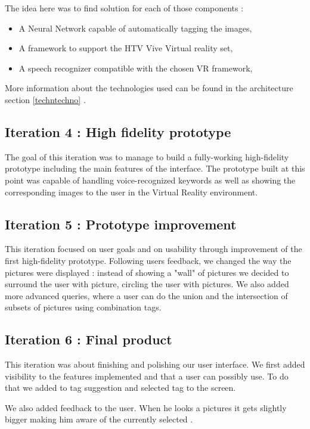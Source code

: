 \documentclass[11pt,a4paper]{article}
\begin{document}
The idea here was to find solution for each of those components :
\begin{itemize}
	\item A Neural Network capable of automatically tagging the images,
	\item A framework to support the HTV Vive Virtual reality set,
	\item A speech recognizer compatible with the chosen VR framework,
\end{itemize}

More information about the technologies used can be found in the architecture section \ref{techntechno} .

\subsection{Iteration 4 : High fidelity prototype}

The goal of this iteration was to manage to build a fully-working high-fidelity prototype including the main features of the interface.
The prototype built at this point was capable of handling voice-recognized keywords as well as showing the corresponding images to the user in the Virtual Reality environment.

\subsection{Iteration 5 : Prototype improvement}

This iteration focused on user goals and on usability through improvement of the first high-fidelity prototype. Following users feedback, we changed the way the pictures were displayed : instead of showing a "wall" of pictures we decided to surround the user with picture, circling the user with pictures.
We also added more advanced queries, where a user can do the union and the intersection of subsets of pictures using combination tags.

\subsection{Iteration 6 : Final product}

This iteration was about finishing and polishing our user interface. We first added visibility to the features implemented and that a user can possibly use. To do that we added to tag suggestion and selected tag to the screen.

We also added feedback to the user. When he looks a pictures it gets slightly bigger making him aware of the currently selected .
\end{document}
